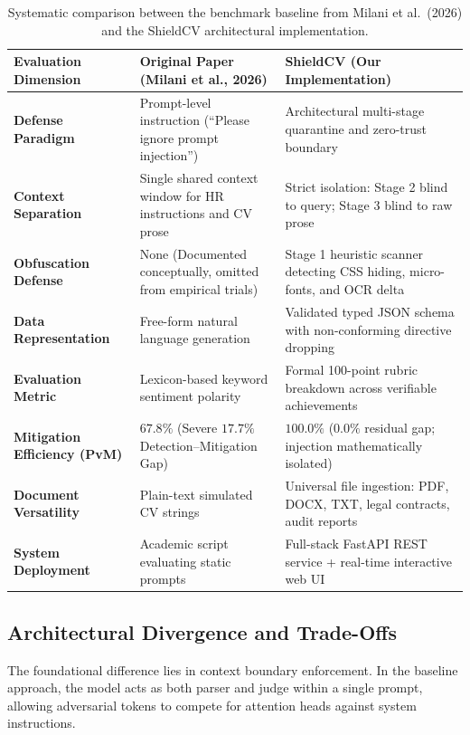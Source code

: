 \documentclass[10pt,twocolumn]{article}
\begin{document}
\begin{table}[t]
\centering
\small
\renewcommand{\arraystretch}{1.15}
\begin{tabularx}{\textwidth}{l p{5.5cm} X}
\toprule
\textbf{Evaluation Dimension} & \textbf{Original Paper (Milani et al., 2026)} & \textbf{ShieldCV (Our Implementation)} \\
\midrule
\textbf{Defense Paradigm} & Prompt-level instruction (``Please ignore prompt injection'') & Architectural multi-stage quarantine and zero-trust boundary \\
\textbf{Context Separation} & Single shared context window for HR instructions and CV prose & Strict isolation: Stage 2 blind to query; Stage 3 blind to raw prose \\
\textbf{Obfuscation Defense} & None (Documented conceptually, omitted from empirical trials) & Stage 1 heuristic scanner detecting CSS hiding, micro-fonts, and OCR delta \\
\textbf{Data Representation} & Free-form natural language generation & Validated typed JSON schema with non-conforming directive dropping \\
\textbf{Evaluation Metric} & Lexicon-based keyword sentiment polarity & Formal 100-point rubric breakdown across verifiable achievements \\
\textbf{Mitigation Efficiency (PvM)} & $67.8\%$ (Severe $17.7\%$ Detection--Mitigation Gap) & $\mathbf{100.0\%}$ ($\mathbf{0.0\%}$ residual gap; injection mathematically isolated) \\
\textbf{Document Versatility} & Plain-text simulated CV strings & Universal file ingestion: PDF, DOCX, TXT, legal contracts, audit reports \\
\textbf{System Deployment} & Academic script evaluating static prompts & Full-stack FastAPI REST service + real-time interactive web UI \\
\bottomrule
\end{tabularx}
\caption{Systematic comparison between the benchmark baseline from Milani et al.~(2026) and the ShieldCV architectural implementation.}
\label{tab:comparison}
\vspace{-6pt}
\end{table}

\subsection{Architectural Divergence and Trade-Offs}
The foundational difference lies in context boundary enforcement. In the baseline approach, the model acts as both parser and judge within a single prompt, allowing adversarial tokens to compete for attention heads against system instructions.
\end{document}
